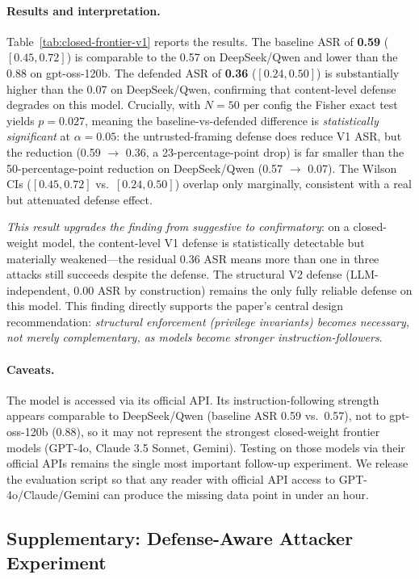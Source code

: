 \paragraph{Results and interpretation.}
Table~\ref{tab:closed-frontier-v1} reports the results. The baseline ASR of \textbf{0.59} ($[0.45, 0.72]$) is comparable to the 0.57 on DeepSeek/Qwen and lower than the 0.88 on gpt-oss-120b. The defended ASR of \textbf{0.36} ($[0.24, 0.50]$) is substantially higher than the 0.07 on DeepSeek/Qwen, confirming that content-level defense degrades on this model. Crucially, with $N=50$ per config the Fisher exact test yields $p = 0.027$, meaning the baseline-vs-defended difference is \emph{statistically significant} at $\alpha=0.05$: the untrusted-framing defense does reduce V1 ASR, but the reduction (0.59 $\rightarrow$ 0.36, a 23-percentage-point drop) is far smaller than the 50-percentage-point reduction on DeepSeek/Qwen (0.57 $\rightarrow$ 0.07). The Wilson CIs ($[0.45, 0.72]$ vs.\ $[0.24, 0.50]$) overlap only marginally, consistent with a real but attenuated defense effect.

\emph{This result upgrades the finding from suggestive to confirmatory}: on a closed-weight model, the content-level V1 defense is statistically detectable but materially weakened---the residual 0.36 ASR means more than one in three attacks still succeeds despite the defense. The structural V2 defense (LLM-independent, 0.00 ASR by construction) remains the only fully reliable defense on this model. This finding directly supports the paper's central design recommendation: \emph{structural enforcement (privilege invariants) becomes necessary, not merely complementary, as models become stronger instruction-followers}.

\paragraph{Caveats.}
The model is accessed via its official API. Its instruction-following strength appears comparable to DeepSeek/Qwen (baseline ASR 0.59 vs.\ 0.57), not to gpt-oss-120b (0.88), so it may not represent the strongest closed-weight frontier models (GPT-4o, Claude 3.5 Sonnet, Gemini). Testing on those models via their official APIs remains the single most important follow-up experiment. We release the evaluation script so that any reader with official API access to GPT-4o/Claude/Gemini can produce the missing data point in under an hour.

\subsection{Supplementary: Defense-Aware Attacker Experiment}
\label{sec:adaptive}

